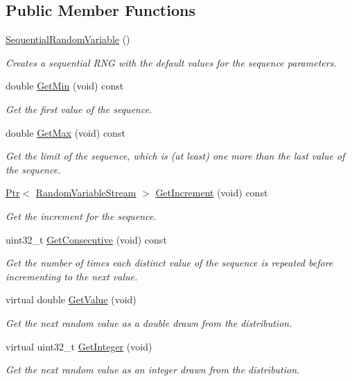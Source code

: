 \subsection*{Public Member Functions}
\begin{DoxyCompactItemize}
\item 
\hyperlink{classns3_1_1SequentialRandomVariable_aed65a4dd9c1d8ecbded1b11a852ab59a}{Sequential\+Random\+Variable} ()
\begin{DoxyCompactList}\small\item\em Creates a sequential R\+NG with the default values for the sequence parameters. \end{DoxyCompactList}\item 
double \hyperlink{classns3_1_1SequentialRandomVariable_a9b3e91e6c67f8fe332fa9a8e1c01c5a6}{Get\+Min} (void) const 
\begin{DoxyCompactList}\small\item\em Get the first value of the sequence. \end{DoxyCompactList}\item 
double \hyperlink{classns3_1_1SequentialRandomVariable_ae761d5525c612dd7abc9bac579c82221}{Get\+Max} (void) const 
\begin{DoxyCompactList}\small\item\em Get the limit of the sequence, which is (at least) one more than the last value of the sequence. \end{DoxyCompactList}\item 
\hyperlink{classns3_1_1Ptr}{Ptr}$<$ \hyperlink{classns3_1_1RandomVariableStream}{Random\+Variable\+Stream} $>$ \hyperlink{classns3_1_1SequentialRandomVariable_ac2511f4f229e230424ef0f8324f1618d}{Get\+Increment} (void) const 
\begin{DoxyCompactList}\small\item\em Get the increment for the sequence. \end{DoxyCompactList}\item 
uint32\+\_\+t \hyperlink{classns3_1_1SequentialRandomVariable_ae02a039bffbc27c727ca39c7eb89b0b7}{Get\+Consecutive} (void) const 
\begin{DoxyCompactList}\small\item\em Get the number of times each distinct value of the sequence is repeated before incrementing to the next value. \end{DoxyCompactList}\item 
virtual double \hyperlink{classns3_1_1SequentialRandomVariable_a78f36ee1a8102df7d7d40c4490ddf250}{Get\+Value} (void)
\begin{DoxyCompactList}\small\item\em Get the next random value as a double drawn from the distribution. \end{DoxyCompactList}\item 
virtual uint32\+\_\+t \hyperlink{classns3_1_1SequentialRandomVariable_ab93ac4c689c25c3b727881925f476401}{Get\+Integer} (void)
\begin{DoxyCompactList}\small\item\em Get the next random value as an integer drawn from the distribution. \end{DoxyCompactList}\end{DoxyCompactItemize}
